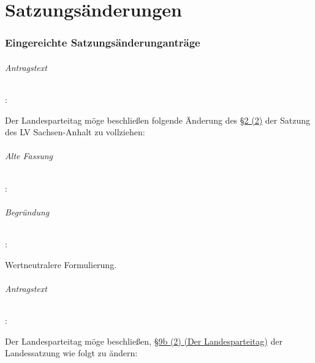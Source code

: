 \part{Satzungsänderungen}
\section{Eingereichte Satzungsänderunganträge}

\paragraph{Antragstext}:

Der Landesparteitag möge beschließen folgende Änderung des \href{http://wiki.piratenpartei.de/LSA:Satzung#.C2.A7_2_-_Mitgliedschaft}{§2 (2)} der Satzung des LV Sachsen-Anhalt zu vollziehen:


\paragraph{Alte Fassung}:


\paragraph{Begründung}:

Wertneutralere Formulierung. 



\paragraph{Antragstext}:

Der Landesparteitag möge beschließen, \href{http://wiki.piratenpartei.de/LSA:Satzung#.C2.A7_9b_-_Der_Landesparteitag}{§9b (2) (Der Landesparteitag)} der Landessatzung wie folgt zu ändern:

